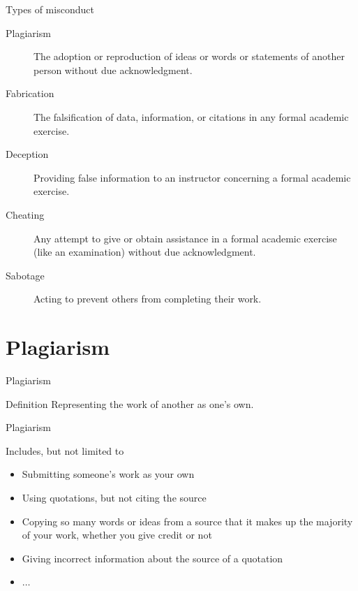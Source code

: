 	\begin{frame}{Types of misconduct}

		\begin{description}
			\item[Plagiarism]
				The adoption or reproduction of ideas or words or statements of another person without due acknowledgment.
			\item[Fabrication]
				The falsification of data, information, or citations in any formal academic exercise.
			\item[Deception]
				Providing false information to an instructor concerning a formal academic exercise.
			\item[Cheating]
				Any attempt to give or obtain assistance in a formal academic exercise (like an examination) without due acknowledgment.
			\item[Sabotage]
				Acting to prevent others from completing their work.
		\end{description}

	\end{frame}

\section{Plagiarism}

	\begin{frame}{Plagiarism}
		
		\begin{block}{Definition}
			Representing the work of another as one’s own.
		\end{block}	

	\end{frame}

	\begin{frame}{Plagiarism}
		
		Includes, but not limited to

		\begin{itemize}
			\item 
				Submitting someone's work as your own
			\item 
				Using quotations, but not citing the source
			\item 
				Copying so many words or ideas from a source that it makes up the majority of your work, whether you give credit or not
			\item 
				Giving incorrect information about the source of a quotation
			\item 
				$\ldots$
		\end{itemize}

	\end{frame}

